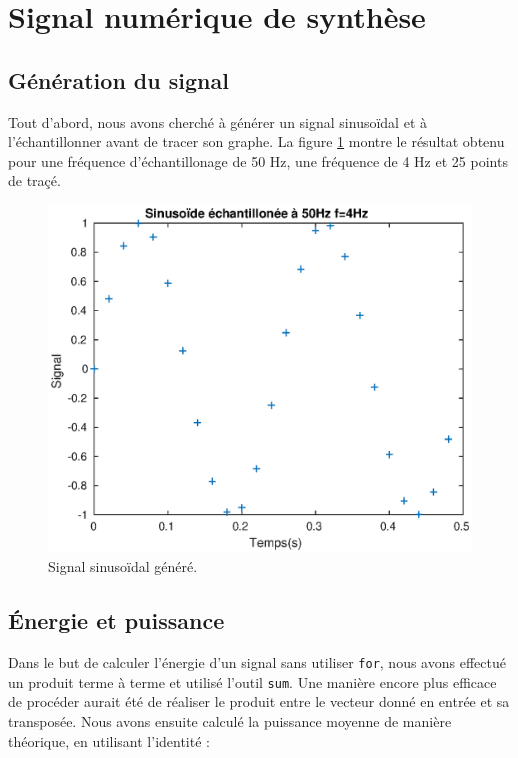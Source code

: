 \documentclass[french]{article}
\begin{document}
\section{Signal numérique de synthèse}

\subsection{Génération du signal}

Tout d'abord, nous avons cherché à générer un signal sinusoïdal et à l'échantillonner avant de tracer son graphe. La figure \ref{signalSin} montre le résultat obtenu pour une fréquence d'échantillonage de 50 Hz, une fréquence de 4 Hz et 25 points de traçé.

\begin{figure}[h!]
\centering
\includegraphics{images/signalSinus.eps}
\caption{Signal sinusoïdal généré.}
\label{signalSin}
\end{figure}

\subsection{ Énergie et puissance}

Dans le but de calculer l'énergie d'un signal sans utiliser \verb`for`, nous avons effectué un produit terme à terme et utilisé l'outil \verb`sum`. Une manière encore plus efficace de procéder aurait été de réaliser le produit entre le vecteur donné en entrée et sa transposée. Nous avons ensuite calculé la puissance moyenne de manière théorique, en utilisant l'identité :
\end{document}
